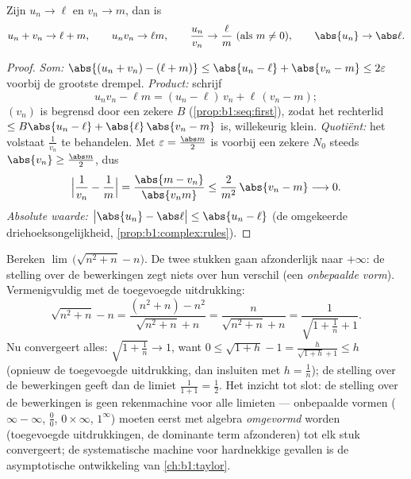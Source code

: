 \begin{theorem}\label{thm:b1:seq:operations}
Zijn $u_n \to \ell$ en $v_n \to m$, dan is
\[
u_n + v_n \to \ell + m, \qquad u_n v_n \to \ell m, \qquad
\frac{u_n}{v_n} \to \frac{\ell}{m} \ (\text{als } m \neq 0),
\qquad \abs{u_n} \to \abs\ell .
\]
\end{theorem}

\begin{proof}
\emph{Som:} $\abs{(u_n + v_n) - (\ell + m)} \leq \abs{u_n - \ell} +
\abs{v_n - m} \leq 2\varepsilon$ voorbij de grootste drempel.
\emph{Product:} schrijf
\[
u_n v_n - \ell m = (u_n - \ell)\,v_n + \ell\,(v_n - m);
\]
$(v_n)$ is begrensd door een zekere $B$ (\cref{prop:b1:seq:first}), zodat
het rechterlid $\leq B\abs{u_n - \ell} + \abs{\ell}\,\abs{v_n - m}$ is,
willekeurig klein. \emph{Quotiënt:} het volstaat $\frac 1{v_n}$ te
behandelen. Met $\varepsilon = \frac{\abs m}{2}$ is voorbij een zekere
$N_0$ steeds $\abs{v_n} \geq \frac{\abs m}{2}$, dus
\[
\Bigl| \frac{1}{v_n} - \frac 1m \Bigr|
= \frac{\abs{m - v_n}}{\abs{v_n m}}
\leq \frac{2}{m^2}\,\abs{v_n - m} \longrightarrow 0 .
\]
\emph{Absolute waarde:} $\bigl|\abs{u_n} - \abs\ell\bigr| \leq \abs{u_n -
\ell}$ (de omgekeerde driehoeksongelijkheid,
\cref{prop:b1:complex:rules}).
\end{proof}

\begin{example}\label{ex:b1:seq:conjugatetrick}
Bereken $\lim\,\bigl(\sqrt{n^2 + n} - n\bigr)$. De twee stukken gaan
afzonderlijk naar $+\infty$: de stelling over de bewerkingen zegt niets
over hun verschil (een \emph{onbepaalde vorm}). Vermenigvuldig met de
toegevoegde uitdrukking:
\[
\sqrt{n^2 + n} - n
= \frac{(n^2 + n) - n^2}{\sqrt{n^2 + n} + n}
= \frac{n}{\sqrt{n^2+n} + n}
= \frac{1}{\sqrt{1 + \frac1n} + 1} .
\]
Nu convergeert alles: $\sqrt{1 + \frac1n} \to 1$, want $0 \leq \sqrt{1 +
h} - 1 = \frac{h}{\sqrt{1+h} + 1} \leq h$ (opnieuw de toegevoegde
uitdrukking, dan insluiten met $h = \frac1n$); de stelling over de
bewerkingen geeft dan de limiet $\frac{1}{1 + 1} = \frac12$. Het inzicht
tot slot: de stelling over de bewerkingen is geen rekenmachine voor alle
limieten --- onbepaalde vormen ($\infty - \infty$, $\frac00$, $0 \times
\infty$, $1^\infty$) moeten eerst met algebra \emph{omgevormd} worden
(toegevoegde uitdrukkingen, de dominante term afzonderen) tot elk stuk
convergeert; de systematische machine voor hardnekkige gevallen is de
asymptotische ontwikkeling van \cref{ch:b1:taylor}.
\end{example}

